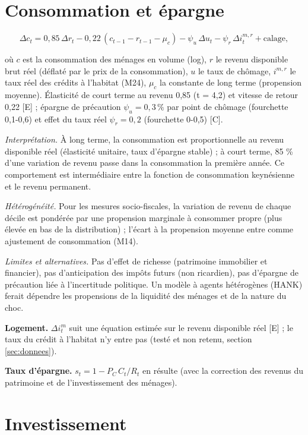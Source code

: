 \documentclass[
  11pt,
  11pt,
  a4paper,
  openany]{book}
\begin{document}
\hypertarget{sec:eq-consommation}{%
\section{Consommation et épargne}\label{sec:eq-consommation}}

\[\Delta c_t = 0{,}85\,\Delta r_t - 0{,}22\,\left(c_{t-1} - r_{t-1} - \mu_c\right) - \psi_u\,\Delta u_t - \psi_r\,\Delta i^{m,r}_t + \text{calage},\]

où \(c\) est la consommation des ménages en volume (log), \(r\) le
revenu disponible brut réel (déflaté par le prix de la consommation),
\(u\) le taux de chômage, \(i^{m,r}\) le taux réel des crédits à
l'habitat (M24), \(\mu_c\) la constante de long terme (propension
moyenne). Élasticité de court terme au revenu 0,85 (t = 4,2) et vitesse
de retour 0,22 {[}E{]} ; épargne de précaution \(\psi_u = 0{,}3\,\%\)
par point de chômage (fourchette 0,1-0,6) et effet du taux réel
\(\psi_r = 0{,}2\) (fourchette 0-0,5) {[}C{]}.

\emph{Interprétation.} À long terme, la consommation est proportionnelle
au revenu disponible réel (élasticité unitaire, taux d'épargne stable) ;
à court terme, 85 \% d'une variation de revenu passe dans la
consommation la première année. Ce comportement est intermédiaire entre
la fonction de consommation keynésienne et le revenu permanent.

\emph{Hétérogénéité.} Pour les mesures socio-fiscales, la variation de
revenu de chaque décile est pondérée par une propension marginale à
consommer propre (plus élevée en bas de la distribution) ; l'écart à la
propension moyenne entre comme ajustement de consommation (M14).

\emph{Limites et alternatives.} Pas d'effet de richesse (patrimoine
immobilier et financier), pas d'anticipation des impôts futurs (non
ricardien), pas d'épargne de précaution liée à l'incertitude politique.
Un modèle à agents hétérogènes (HANK) ferait dépendre les propensions de
la liquidité des ménages et de la nature du choc.

\textbf{Logement.} \(\Delta i^m_t\) suit une équation estimée sur le
revenu disponible réel {[}E{]} ; le taux du crédit à l'habitat n'y entre
pas (testé et non retenu, section \ref{sec:donnees}).

\textbf{Taux d'épargne.} \(s_t = 1 - P_C\,C_t / R_t\) en résulte (avec
la correction des revenus du patrimoine et de l'investissement des
ménages).

\hypertarget{sec:eq-investissement}{%
\section{Investissement}\label{sec:eq-investissement}}
\end{document}
